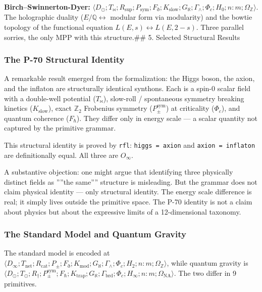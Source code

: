 \documentclass[12pt,a4paper]{article}
\begin{document}
\textbf{Birch--Swinnerton-Dyer:} $\langle D_{\odot}; T_{\bowtie}; R_\text{sup}; P_\text{sym}; F_{\eth}; K_\text{slow}; G_{\aleph}; \Gamma_{\wedge}; \Phi_c; H_0; n{:}m; \Omega_\mathbb{Z} \rangle$. The holographic duality ($E/\mathbb{Q} \leftrightarrow$ modular form via modularity) and the bowtie topology of the functional equation $L(E, s) \leftrightarrow L(E, 2-s)$. Three parallel sorries, the only MPP with this structure.\#\# 5. Selected Structural Results

\subsubsection{The P-70 Structural Identity}

A remarkable result emerged from the formalization: the Higgs boson, the axion, and the inflaton are structurally identical synthons. Each is a spin-0 scalar field with a double-well potential ($T_{\bowtie}$), slow-roll / spontaneous symmetry breaking kinetics ($K_\text{slow}$), exact $\mathbb{Z}_2$ Frobenius symmetry ($P_{\pm}^{\text{sym}}$) at criticality ($\Phi_c$), and quantum coherence ($F_{\hbar}$). They differ only in energy scale --- a scalar quantity not captured by the primitive grammar.

This structural identity is proved by \texttt{rfl}: \texttt{higgs = axion} and \texttt{axion = inflaton} are definitionally equal. All three are $O_{\infty}$.

A substantive objection: one might argue that identifying three physically distinct fields as ''''the same'''' structure is misleading. But the grammar does not claim physical identity --- only structural identity. The energy scale difference is real; it simply lives outside the primitive space. The P-70 identity is not a claim about physics but about the expressive limits of a 12-dimensional taxonomy.

\subsubsection{The Standard Model and Quantum Gravity}

The standard model is encoded at $\langle D_{\infty}; T_\text{net}; R_\text{cat}; P_{\pm}; F_{\eth}; K_\text{mod}; G_{\aleph}; \Gamma_{\wedge}; \Phi_c; H_2; n{:}m; \Omega_\mathbb{Z} \rangle$, while quantum gravity is $\langle D_{\odot}; T_{\odot}; R_{\dagger}; P_{\pm}^{\text{sym}}; F_{\hbar}; K_\text{trap}; G_{\aleph}; \Gamma_\text{brd}; \Phi_c; H_{\infty}; n{:}m; \Omega_\text{NA} \rangle$. The two differ in 9 primitives.
\end{document}
